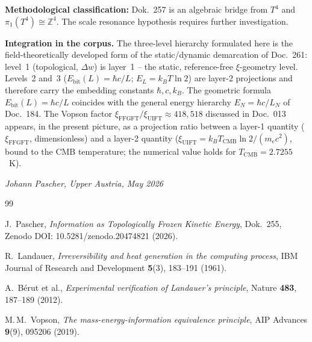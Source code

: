 \bigskip
\noindent
\textbf{Methodological classification:}
Dok.~257 is an algebraic bridge from \(T^4\) and
\(\pi_1(T^4) \cong \mathbb{Z}^4\).
The scale resonance hypothesis requires further investigation.

\bigskip
\noindent
\textbf{Integration in the corpus.}
The three-level hierarchy formulated here is the field-theoretically
developed form of the static/dynamic demarcation of Doc.~261:
level~1 (topological, \(\Delta w\)) is layer~1 -- the static,
reference-free \(\xi\)-geometry level. Levels~2 and~3
(\(E_\text{bit}(L) = \hbar c/L\); \(E_L = k_B T \ln 2\)) are layer-2
projections and therefore carry the embedding constants
\(\hbar, c, k_B\). The geometric formula \(E_\text{bit}(L) = \hbar c/L\)
coincides with the general energy hierarchy \(E_N = \hbar c/L_N\) of
Doc.~184. The Vopson factor
\(\xi_\text{FFGFT}/\xi_\text{UIFT} \approx 418{,}518\) discussed in
Doc.~013 appears, in the present picture, as a projection ratio between
a layer-1 quantity (\(\xi_\text{FFGFT}\), dimensionless) and a layer-2
quantity (\(\xi_\text{UIFT} = k_B T_\text{CMB}\ln 2/(m_e c^2)\), bound
to the CMB temperature; the numerical value holds for \(T_\text{CMB} = 2.7255\)~K).

\bigskip
\begin{flushright}
\textit{Johann Pascher, Upper Austria, May 2026}
\end{flushright}

\begin{thebibliography}{99}

J.~Pascher,
\textit{Information as Topologically Frozen Kinetic Energy},
Dok.~255, Zenodo DOI: 10.5281/zenodo.20474821 (2026).

R.~Landauer,
\textit{Irreversibility and heat generation in the computing process},
IBM Journal of Research and Development \textbf{5}(3), 183--191 (1961).

A.~Bérut et al.,
\textit{Experimental verification of Landauer's principle},
Nature \textbf{483}, 187--189 (2012).

M.\,M.~Vopson,
\textit{The mass-energy-information equivalence principle},
AIP Advances \textbf{9}(9), 095206 (2019).

\end{thebibliography}
